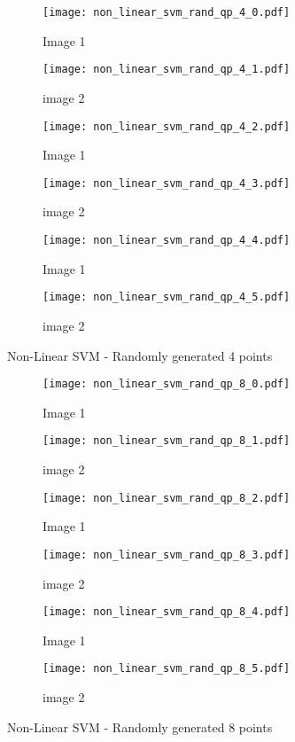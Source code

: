 \documentclass[10pt, a4paper,reqno]{amsart}
\begin{document}
\begin{figure}
	\centering	
	\begin{subfigure}{0.5\textwidth}
		\centering
		\texttt{[image: non\_linear\_svm\_rand\_qp\_4\_0.pdf]}
		\caption{Image 1}
	\end{subfigure}%
	\begin{subfigure}{0.5\textwidth}
		\centering
		\texttt{[image: non\_linear\_svm\_rand\_qp\_4\_1.pdf]}
		\caption{image 2}
	\end{subfigure}
	\begin{subfigure}{0.5\textwidth}
		\centering
		\texttt{[image: non\_linear\_svm\_rand\_qp\_4\_2.pdf]}
		\caption{Image 1}
	\end{subfigure}%
	\begin{subfigure}{0.5\textwidth}
		\centering
		\texttt{[image: non\_linear\_svm\_rand\_qp\_4\_3.pdf]}
		\caption{image 2}
	\end{subfigure}
	\begin{subfigure}{0.5\textwidth}
		\centering
		\texttt{[image: non\_linear\_svm\_rand\_qp\_4\_4.pdf]}
		\caption{Image 1}
	\end{subfigure}%
	\begin{subfigure}{0.5\textwidth}
		\centering
		\texttt{[image: non\_linear\_svm\_rand\_qp\_4\_5.pdf]}
		\caption{image 2}
	\end{subfigure}
	\caption{Non-Linear SVM - Randomly generated 4 points}
\end{figure}

\begin{figure}
	\centering	
	\begin{subfigure}{0.5\textwidth}
		\centering
		\texttt{[image: non\_linear\_svm\_rand\_qp\_8\_0.pdf]}
		\caption{Image 1}
	\end{subfigure}%
	\begin{subfigure}{0.5\textwidth}
		\centering
		\texttt{[image: non\_linear\_svm\_rand\_qp\_8\_1.pdf]}
		\caption{image 2}
	\end{subfigure}
	\begin{subfigure}{0.5\textwidth}
		\centering
		\texttt{[image: non\_linear\_svm\_rand\_qp\_8\_2.pdf]}
		\caption{Image 1}
	\end{subfigure}%
	\begin{subfigure}{0.5\textwidth}
		\centering
		\texttt{[image: non\_linear\_svm\_rand\_qp\_8\_3.pdf]}
		\caption{image 2}
	\end{subfigure}
	\begin{subfigure}{0.5\textwidth}
		\centering
		\texttt{[image: non\_linear\_svm\_rand\_qp\_8\_4.pdf]}
		\caption{Image 1}
	\end{subfigure}%
	\begin{subfigure}{0.5\textwidth}
		\centering
		\texttt{[image: non\_linear\_svm\_rand\_qp\_8\_5.pdf]}
		\caption{image 2}
	\end{subfigure}
	\caption{Non-Linear SVM - Randomly generated 8 points}
\end{figure}
\end{document}
